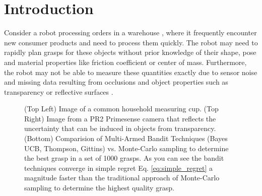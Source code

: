 \documentclass[journal,transmag]{IEEEtran}%
\begin{document}
\section{Introduction}



Consider a robot processing orders in a warehouse , where it frequently encounter new consumer products and need to process them quickly.
The robot may need to rapidly plan grasps for these objects without prior knowledge of their shape, pose and material properties like friction coefficient or center of mass. 
Furthermore, the robot may not be able to measure these quantities exactly due to sensor noise and missing data resulting from occlusions and object properties such as transparency or reflective surfaces .

\begin{figure}%
    \centering
    
       \qquad
  
   
    \caption{(Top Left) Image of a common household measuring cup. (Top Right) Image from a PR2 Primesense camera that reflects the uncertainty that can be induced in objects from transparency. (Bottom) Comparision of Multi-Armed Bandit Techniques (Bayes UCB, Thompson, Gittins) vs. Monte-Carlo sampling to determine the best grasp in a set of 1000 grasps. As you can see the bandit techniques converge in simple regret Eq. \ref{eq:simple_regret} a magnitude faster than the traditional approach of Monte-Carlo sampling to determine the highest quality grasp.  }%
    \label{fig:rot_shapes}%
\end{figure}
\end{document}
